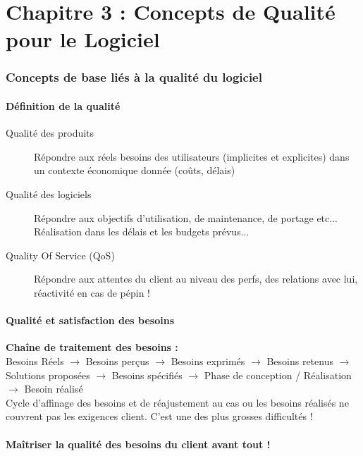 \part{Chapitre 3 : Concepts de Qualité pour le Logiciel}

\section{Concepts de base liés à la qualité du logiciel}

	\subsection{Définition de la qualité}

	\begin{description}
    \item[Qualité des produits] Répondre aux réels besoins des utilisateurs (implicites et explicites) dans un contexte économique donnée (coûts, délais)
    \item[Qualité des logiciels] Répondre aux objectifs d’utilisation, de maintenance, de portage etc... Réalisation dans les délais et les budgets prévus...
    \item[Quality Of Service (QoS)] Répondre aux attentes du client au niveau des perfs, des relations avec lui, réactivité en cas de pépin !
	\end{description}


   \subsection{Qualité et satisfaction des besoins}

\textbf{Chaîne de traitement des besoins :}\hfill\\

Besoins Réels $\rightarrow$ Besoins perçus $\rightarrow$ Besoins exprimés $\rightarrow$ Besoins retenus  $\rightarrow$  Solutions proposées $\rightarrow$ Besoins spécifiés $\rightarrow$ Phase de conception / Réalisation $\rightarrow$ Besoin réalisé\\

Cycle d’affinage des besoins et de réajustement au cas ou les besoins réalisés ne couvrent pas les exigences client. C’est une des plus grosses difficultés !\\

   \subsection{Maîtriser la qualité des besoins du client avant tout !}

